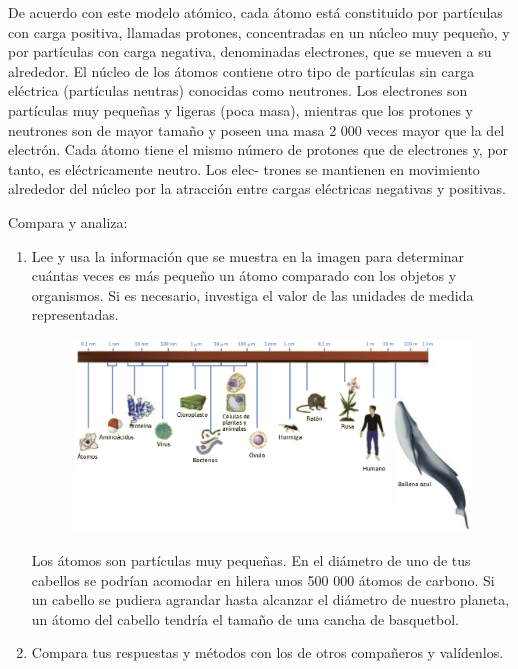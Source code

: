 \documentclass[11pt]{book}
\begin{document}
De acuerdo con este modelo atómico, cada átomo está constituido por partículas
con carga positiva, llamadas protones, concentradas en un núcleo muy pequeño, y por
partículas con carga negativa, denominadas electrones, que se mueven a su alrededor.
El núcleo de los átomos contiene otro tipo de partículas sin carga eléctrica (partículas
neutras) conocidas como neutrones. Los electrones son partículas muy pequeñas y
ligeras (poca masa), mientras que los protones y neutrones son de mayor tamaño y
poseen una masa 2 000 veces mayor que la del electrón. Cada átomo tiene el mismo
número de protones que de electrones y, por tanto, es eléctricamente neutro. Los elec-
trones se mantienen en movimiento alrededor del núcleo por la atracción entre cargas
eléctricas negativas y positivas.


\begin{boxK}
  Compara y analiza:\\
  \begin{enumerate}
    \item Lee y usa la información que se muestra en la imagen para determinar cuántas
          veces es más pequeño un átomo comparado con los objetos y organismos. Si es
          necesario, investiga el valor de las unidades de medida representadas.

          \begin{figure}[H]
            \centering
            \includegraphics[width=.9\textwidth]{escala.png}
          \end{figure}

          Los átomos son partículas muy pequeñas. En el diámetro de uno de tus cabellos se podrían
          acomodar en hilera unos 500 000 átomos de carbono. Si un cabello se pudiera agrandar
          hasta alcanzar el diámetro de nuestro planeta, un átomo del cabello tendría el tamaño de
          una cancha de basquetbol.

    \item Compara tus respuestas y métodos con los de otros compañeros y valídenlos.
  \end{enumerate}
\end{boxK}
\newpage
\end{document}
